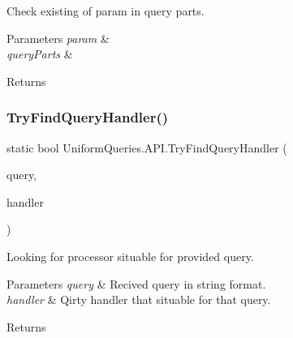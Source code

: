 Check existing of param in query parts. 


\begin{DoxyParams}{Parameters}
{\em param} & \\
\hline
{\em query\+Parts} & \\
\hline
\end{DoxyParams}
\begin{DoxyReturn}{Returns}

\end{DoxyReturn}
\mbox{\label{class_uniform_queries_1_1_a_p_i_a6b5e9796e2ed61c94fc49df8e6fec0d9}} 
\subsubsection{\texorpdfstring{Try\+Find\+Query\+Handler()}{TryFindQueryHandler()}\hspace{0.1cm}{\footnotesize\ttfamily [1/2]}}
{\footnotesize\ttfamily static bool Uniform\+Queries.\+A\+P\+I.\+Try\+Find\+Query\+Handler (\begin{DoxyParamCaption}\item[{string}]{query,  }\item[{out \mbox{\hyperlink{interface_uniform_queries_1_1_executable_1_1_i_query_handler}{I\+Query\+Handler}}}]{handler }\end{DoxyParamCaption})\hspace{0.3cm}{\ttfamily [static]}}



Looking for processor situable for provided query. 


\begin{DoxyParams}{Parameters}
{\em query} & Recived query in string format.\\
\hline
{\em handler} & Qirty handler that situable for that query.\\
\hline
\end{DoxyParams}
\begin{DoxyReturn}{Returns}

\end{DoxyReturn}
\mbox{\label{class_uniform_queries_1_1_a_p_i_a0b929a433be6dc51a05718bd682317f9}} 

